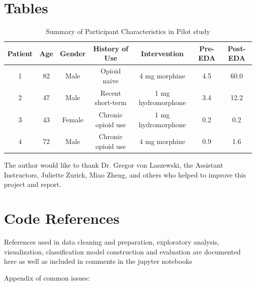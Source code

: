 \documentclass[sigconf]{acmart}
\begin{document}
\section{Tables}


\begin{table}
  \caption{Summary of Participant Characteristics in Pilot study \cite{carreiro15}}
  \label{tab:freq}
  \begin{tabular}{ccccccc}
    \toprule
     Patient& Age& Gender& History of Use& Intervention& Pre-EDA& Post-EDA \\
    \midrule
    1& 82& Male& Opioid naive& 4 mg morphine& 4.5& 60.0 \\
    2& 47& Male& Recent short-term& 1 mg hydromorphone& 3.4& 12.2 \\
    3& 43& Female& Chronic opioid use& 1 mg hydromorphone& 0.2& 0.2 \\
    4& 72& Male& Chronic opioid use& 4 mg morphine& 0.9& 1.6 \\
    \bottomrule
  \end{tabular}
\end{table}


\begin{acks}

  The author would like to thank Dr. Gregor von Laszewski, 
  the Assistant Instructors, Juliette Zurick, Miao Zheng,
  and others who helped to improve this project and report.

\end{acks}


 


\appendix

\section{Code References}
References used in data cleaning and preparation, exploratory analysis, 
visualization, classification model construction and evaluation are documented
here as well as included in comments in the jupyter notebooks 
\cite{muller17,mckinney17,vanderplas17}

Appendix of common issues: 




%
\end{document}
